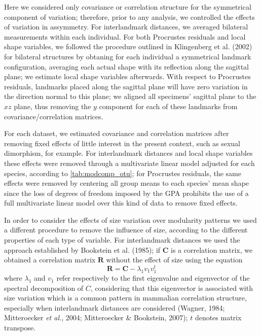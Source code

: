 \documentclass[12pt,]{article}
\begin{document}
Here we considered only covariance or correlation structure for the
symmetrical component of variation; therefore, prior to any analysis, we
controlled the effects of variation in assymmetry. For interlandmark
distances, we averaged bilateral measurements within each individual.
For both Procrustes residuals and local shape variables, we followed the
procedure outlined in Klingenberg et al. (2002) for bilateral structures
by obtaning for each individual a symmetrical landmark configuration,
averaging each actual shape with its reflection along the sagittal
plane; we estimate local shape variables afterwards. With respect to
Procrustes residuals, landmarks placed along the sagittal plane will
have zero variation in the direction normal to this plane; we aligned
all specimens' sagittal plane to the $xz$ plane, thus removing the $y$
component for each of these landmarks from covariance/correlation
matrices.

For each dataset, we estimated covariance and correlation matrices after
removing fixed effects of little interest in the present context, such
as sexual dimorphism, for example. For interlandmark distances and local
shape variables these effects were removed through a multivariate linear
model adjusted for each species, according to \autoref{tab:modcomp_otu};
for Procrustes residuals, the same effects were removed by centering all
group means to each species' mean shape since the loss of degrees of
freedom imposed by the GPA prohibits the use of a full multivariate
linear model over this kind of data to remove fixed effects.

In order to consider the effects of size variation over modularity
patterns we used a different procedure to remove the influence of size,
according to the different properties of each type of variable. For
interlandmark distances we used the approach established by Bookstein et
al. (1985); if $\mathbf{C}$ is a correlation matrix, we obtained a
correlation matrix $\mathbf{R}$ without the effect of size using the
equation \[
\mathbf{R} = \mathbf{C} - \lambda_1 v_1 v^{t}_1
\] where $\lambda_1$ and $v_1$ refer respectively to the first
eigenvalue and eigenvector of the spectral decomposition of $C$,
considering that this eigenvector is associated with size variation
which is a common pattern in mammalian correlation structure, especially
when interlandmark distances are considered (Wagner, 1984; Mitteroecker
\emph{et al.}, 2004; Mitteroecker \& Bookstein, 2007); $t$ denotes
matrix transpose.
\end{document}

